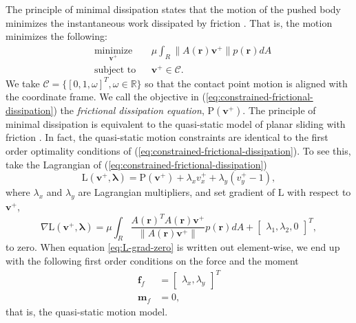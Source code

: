 \documentclass[conference]{IEEEtran}
\newcommand{\BB}[1]{{\color{red} {Byron: {#1}}}}
\begin{document}
The principle of minimal dissipation states that the motion of the
pushed body minimizes the instantaneous work dissipated by friction
\cite{alexander1993bounds}. That is, the motion minimizes the
following: 
\begin{equation} \begin{aligned}
& \underset{\mathbf{v}^+}{\text{minimize}}
& & \mu\int_R\lVert A(\mathbf{r})\mathbf{v}^+ \rVert p(\mathbf{r}) dA \\
& \text{subject to}
& & \mathbf{v}^+ \in \mathcal{C}.
\end{aligned} \label{eq:constrained-frictional-dissipation}
\end{equation}
We take $\mathcal{C} = \{[0,1,\omega]^T, \omega \in \mathbb{R}\}$ so
that the contact point motion is aligned with the coordinate frame. We
call the objective in (\ref{eq:constrained-frictional-dissipation})
the \textit{frictional dissipation equation},
$\mathrm{P}(\mathbf{v}^+)$. The principle of minimal dissipation is
equivalent to the quasi-static model of planar sliding with friction
\cite{alexander1993bounds}.  In fact, the quasi-static motion
constraints are identical to the first order optimality conditions of
(\ref{eq:constrained-frictional-dissipation}). To see this, take the
Lagrangian of (\ref{eq:constrained-frictional-dissipation})
\begin{equation}
  \mathrm{L}(\mathbf{v}^+,\mathbf{\lambda}) = \mathrm{P}(\mathbf{v}^+) + \lambda_xv^+_x + \lambda_y(v^+_y-1),
\end{equation}
where $\lambda_x$ and $\lambda_y$ are Lagrangian multipliers, and set
gradient of $\mathrm{L}$ with respect to $\mathbf{v}^+$,
\begin{equation}
  \nabla\mathrm{L}(\mathbf{v}^+,\mathbf{\lambda}) = \mu\int_R\frac{A(\mathbf{r})^TA(\mathbf{r})\mathbf{v}^+}{\lVert A(\mathbf{r})\mathbf{v}^+ \rVert} p(\mathbf{r}) dA + \begin{bmatrix}\lambda_1, \lambda_2, 0\end{bmatrix}^T, \label{eq:L-grad-zero}
\end{equation}
to zero. When equation \ref{eq:L-grad-zero} is written out
element-wise, we end up with the following first order conditions on
the force and the moment %
\begin{align}
  \mathbf{f}_f &= \begin{bmatrix}\lambda_x, \lambda_y\end{bmatrix}^T\\
  \mathbf{m}_f &= 0,
\end{align}
that is, the quasi-static motion model.
\end{document}
